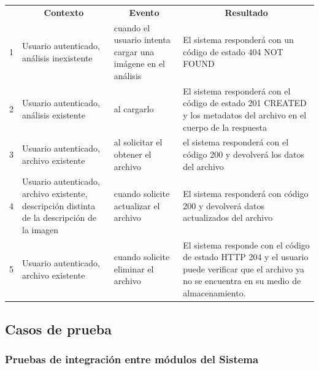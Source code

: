 \documentclass[a4paper,12pt]{article}
\begin{document}
\begin{center}
\begin{longtable}{|p{0.7cm}|p{4cm}|p{4cm}|p{5cm}| }

	\hline 
		\rowcolor[gray]{0.9} 
		\multicolumn{4}{|c|}{\textbf{Criterio de aceptación}} \\
	\hline
    	\rowcolor[gray]{0.9} 
    	\multicolumn{1}{|c}{\textbf{Id}} & \multicolumn{1}{|c}{\textbf{Contexto}} &  \multicolumn{1}{|c}{\textbf{Evento}} & \multicolumn{1}{|c|}{\textbf{Resultado}} \\
    \hline
    	
1&Usuario autenticado, análisis inexistente & cuando el usuario intenta cargar una imágene en el análisis & El sistema responderá con un código de estado 404 NOT FOUND\\ \hline
 
2& Usuario autenticado, análisis existente   & al cargarlo & El sistema responderá con el código de estado 201 CREATED y los metadatos del archivo en el cuerpo de la respuesta\\ \hline

3& Usuario autenticado, archivo existente & al solicitar el obtener el archivo & el sistema responderá con el código 200 y devolverá los datos del archivo\\ \hline

4& Usuario autenticado, archivo existente, descripción distinta de la descripción de la imagen & cuando solicite actualizar el archivo & El sistema responderá con código 200 y devolverá datos actualizados del archivo\\ \hline

5& Usuario autenticado, archivo existente & cuando solicite eliminar el archivo & El sistema responde con el código de estado HTTP 204 y el usuario puede verificar que el archivo ya no se encuentra en su medio de almacenamiento.\\ \hline

  \end{longtable}
\end{center}


\subsection{Casos de prueba}

\subsubsection{Pruebas  de  integración  entre módulos del Sistema}
\end{document}
